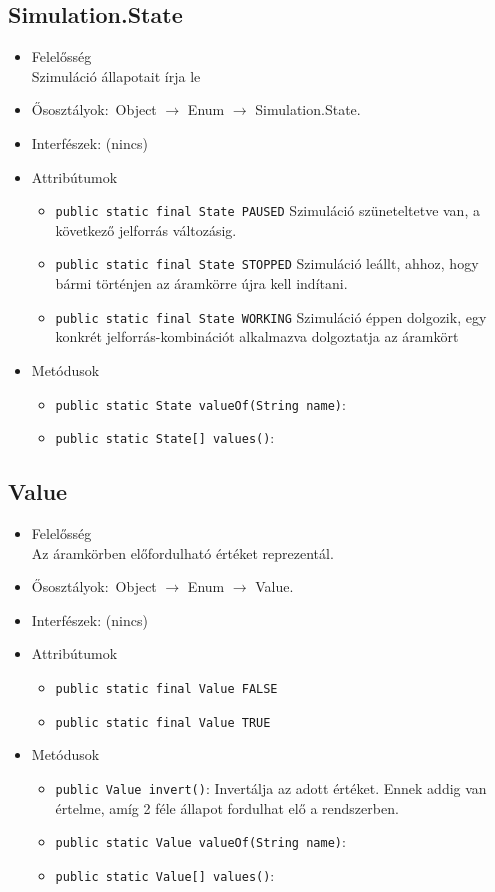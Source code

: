 \subsection{Simulation.State}
\begin{itemize}
\item Felelősség\\
Szimuláció állapotait írja le
\item Ősosztályok:\ Object $\rightarrow{}$ Enum $\rightarrow{}$ Simulation.State.
\item Interfészek: (nincs)
\item Attribútumok $\ $
\begin{itemize}
	\item \texttt{public static final State PAUSED} Szimuláció szüneteltetve van, a következő jelforrás változásig.
	\item \texttt{public static final State STOPPED} Szimuláció leállt, ahhoz, hogy bármi történjen az áramkörre újra kell indítani.
	\item \texttt{public static final State WORKING} Szimuláció éppen dolgozik, egy konkrét jelforrás-kombinációt alkalmazva dolgoztatja az áramkört
\end{itemize}
\item Metódusok$\ $
\begin{itemize}
	\item \texttt{public static State valueOf(String name)}: 
	\item \texttt{public static State[] values()}: 
\end{itemize}
\end{itemize}

\subsection{Value}
\begin{itemize}
\item Felelősség\\
Az áramkörben előfordulható értéket reprezentál.
\item Ősosztályok:\ Object $\rightarrow{}$ Enum $\rightarrow{}$ Value.
\item Interfészek: (nincs)
\item Attribútumok $\ $
\begin{itemize}
	\item \texttt{public static final Value FALSE} 
	\item \texttt{public static final Value TRUE} 
\end{itemize}
\item Metódusok$\ $
\begin{itemize}
	\item \texttt{public Value invert()}: Invertálja az adott értéket. Ennek addig van értelme, amíg 2 féle  állapot fordulhat elő a rendszerben.
	\item \texttt{public static Value valueOf(String name)}: 
	\item \texttt{public static Value[] values()}: 
\end{itemize}
\end{itemize}

